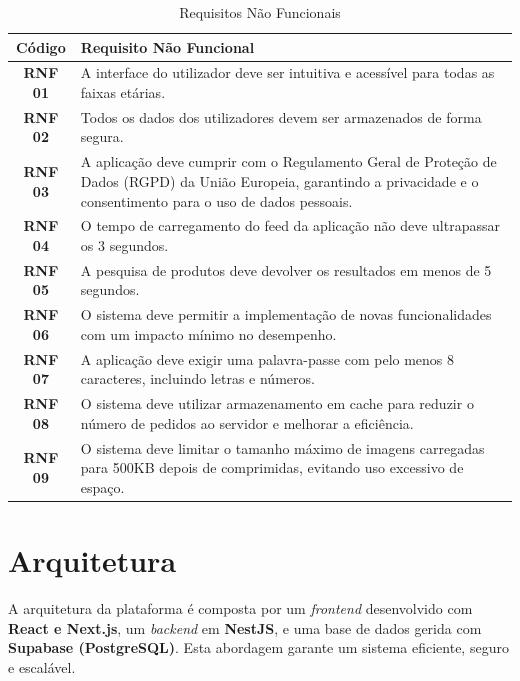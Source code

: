 \documentclass[a4paper, 12pt]{article} %
\begin{document}
\begin{table}[H]
	\centering
	\renewcommand{\arraystretch}{1.3}
	\begin{tabular}{|c|p{12cm}|}
		\hline
		\textbf{Código} & \textbf{Requisito Não Funcional} \\
		\hline
		\textbf{RNF 01} & A interface do utilizador deve ser intuitiva e acessível para todas as faixas etárias. \\
		\hline
		\textbf{RNF 02} & Todos os dados dos utilizadores devem ser armazenados de forma segura. \\
		\hline
		\textbf{RNF 03} & A aplicação deve cumprir com o Regulamento Geral de Proteção de Dados (RGPD) da União Europeia, garantindo a privacidade e o consentimento para o uso de dados pessoais. \\
		\hline
		\textbf{RNF 04} & O tempo de carregamento do feed da aplicação não deve ultrapassar os 3 segundos. \\
		\hline
		\textbf{RNF 05} & A pesquisa de produtos deve devolver os resultados em menos de 5 segundos.\\
		\hline
		\textbf{RNF 06} & O sistema deve permitir a implementação de novas funcionalidades com um impacto mínimo no desempenho. \\
		\hline
		\textbf{RNF 07} & A aplicação deve exigir uma palavra-passe com pelo menos 8 caracteres, incluindo letras e números. \\
		\hline
		\textbf{RNF 08} & O sistema deve utilizar armazenamento em cache para reduzir o número de pedidos ao servidor e melhorar a eficiência. \\
		\hline
		\textbf{RNF 09} & O sistema deve limitar o tamanho máximo de imagens carregadas para 500KB depois de comprimidas, evitando uso excessivo de espaço. \\
		\hline
	\end{tabular}
	\caption{Requisitos Não Funcionais}
	\label{tab:requisitos_nao_funcionais}
\end{table}


\newpage

\section{Arquitetura}
A arquitetura da plataforma é composta por um \textit{frontend} desenvolvido com \textbf{React e Next.js}, um \textit{backend} em \textbf{NestJS}, e uma base de dados gerida com \textbf{Supabase (PostgreSQL)}. Esta abordagem garante um sistema eficiente, seguro e escalável.
\end{document}
